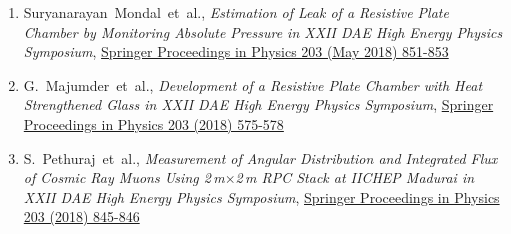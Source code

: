 \documentclass[12pt]{article}
\begin{document}
\begin{justify}
\begin{enumerate}[b.]
\begin{enumerate}[1.]
  \item Suryanarayan~Mondal~et~al., \emph{Estimation of Leak of a Resistive Plate Chamber by Monitoring Absolute Pressure in XXII DAE High Energy Physics Symposium}, \href{https://doi.org/10.1007/978-3-319-73171-1_207}{Springer Proceedings in Physics 203 (May 2018) 851-853}
  \item G.~Majumder~et~al., \emph{Development of a Resistive Plate Chamber with Heat Strengthened Glass in XXII DAE High Energy Physics Symposium}, \href{https://doi.org/10.1007/978-3-319-73171-1_135}{Springer Proceedings in Physics 203 (2018) 575-578}
  \item S.~Pethuraj~et~al., \emph{Measurement of Angular Distribution and Integrated Flux of Cosmic Ray Muons Using 2\,m$\times$2\,m RPC Stack at IICHEP Madurai in XXII DAE High Energy Physics Symposium}, \href{https://doi.org/10.1007/978-3-319-73171-1_205}{Springer Proceedings in Physics 203 (2018) 845-846}
  \end{enumerate}
\end{enumerate}
\end{justify}

\newpage
\end{document}
